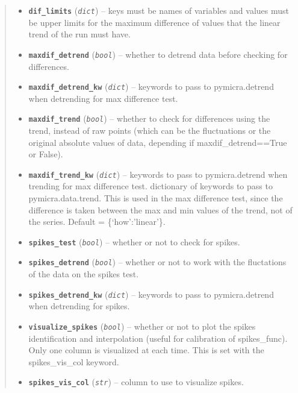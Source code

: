 \documentclass[a4paper,10pt,oneside]{sphinxmanual}
\begin{document}
\begin{fulllineitems}
\begin{quote}
\begin{description}
\begin{itemize}
\item {} 
\textbf{\texttt{dif\_limits}} (\emph{\texttt{dict}}) -- keys must be names of variables and values must be upper limits for the maximum difference
of values that the linear trend of the run must have.

\item {} 
\textbf{\texttt{maxdif\_detrend}} (\emph{\texttt{bool}}) -- whether to detrend data before checking for differences.

\item {} 
\textbf{\texttt{maxdif\_detrend\_kw}} (\emph{\texttt{dict}}) -- keywords to pass to pymicra.detrend when detrending for max difference test.

\item {} 
\textbf{\texttt{maxdif\_trend}} (\emph{\texttt{bool}}) -- whether to check for differences using the trend, instead of raw points (which can be the fluctuations
or the original absolute values of data, depending if maxdif\_detrend==True or False).

\item {} 
\textbf{\texttt{maxdif\_trend\_kw}} (\emph{\texttt{dict}}) -- keywords to pass to pymicra.detrend when trending for max difference test.
dictionary of keywords to pass to pymicra.data.trend. This is used in the max difference test, since
the difference is taken between the max and min values of the trend, not of the series.
Default = \{`how':'linear'\}.

\item {} 
\textbf{\texttt{spikes\_test}} (\emph{\texttt{bool}}) -- whether or not to check for spikes.

\item {} 
\textbf{\texttt{spikes\_detrend}} (\emph{\texttt{bool}}) -- whether or not to work with the fluctations of the data on the spikes test.

\item {} 
\textbf{\texttt{spikes\_detrend\_kw}} (\emph{\texttt{dict}}) -- keywords to pass to pymicra.detrend when detrending for spikes.

\item {} 
\textbf{\texttt{visualize\_spikes}} (\emph{\texttt{bool}}) -- whether or not to plot the spikes identification and interpolation (useful for calibration of spikes\_func). Only
one column is visualized at each time. This is set with the spikes\_vis\_col keyword.

\item {} 
\textbf{\texttt{spikes\_vis\_col}} (\emph{\texttt{str}}) -- column to use to visualize spikes.


\end{itemize}
\end{description}
\end{quote}
\end{fulllineitems}
\end{document}
